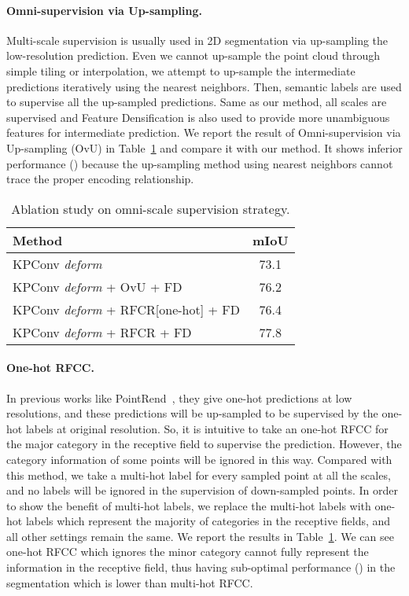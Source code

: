 \documentclass[final]{cvpr}
\begin{document}
\paragraph{Omni-supervision via Up-sampling.}

Multi-scale supervision is usually used in 2D segmentation via up-sampling the low-resolution prediction. Even we cannot up-sample the point cloud through simple tiling or interpolation, we attempt to up-sample the intermediate predictions iteratively using the nearest neighbors. Then, semantic labels are used to supervise all the up-sampled predictions. Same as our method, all scales are supervised and Feature Densification is also used to provide more unambiguous features for intermediate prediction. We report the result of Omni-supervision via Up-sampling (OvU) in Table~\ref{tab:strategy} and compare it with our method. It shows inferior performance () because the up-sampling method using nearest neighbors cannot trace the proper encoding relationship.

\begin{table}
\centering
\begin{tabular}{lc} 
\toprule
Method  & mIoU \\
\midrule
KPConv \textit{deform} & 73.1\\
\midrule
KPConv \textit{deform} + OvU + FD & 76.2\\
KPConv \textit{deform} + RFCR[one-hot] + FD & 76.4\\
\midrule
KPConv \textit{deform} + RFCR + FD& 77.8 \\
\bottomrule
\end{tabular}
\caption{Ablation study on omni-scale supervision strategy.}
\label{tab:strategy}
\end{table}

\paragraph{One-hot RFCC.}
In previous works like PointRend~\cite{kirillov2020pointrend}, they give one-hot predictions at low resolutions, and these predictions will be up-sampled to be supervised by the one-hot labels at original resolution. So, it is intuitive to take an one-hot RFCC for the major category in the receptive field to supervise the prediction. However, the category information of some points will be ignored in this way. Compared with this method, we take a multi-hot label for every sampled point at all the scales, and no labels will be ignored in the supervision of down-sampled points. In order to show the benefit of multi-hot labels, we replace the multi-hot labels with one-hot labels which represent the majority of categories in the receptive fields, and all other settings remain the same. We report the results in Table~\ref{tab:strategy}. We can see one-hot RFCC which ignores the minor category cannot fully represent the information in the receptive field, thus having sub-optimal performance () in the segmentation which is  lower than multi-hot RFCC.
\end{document}
